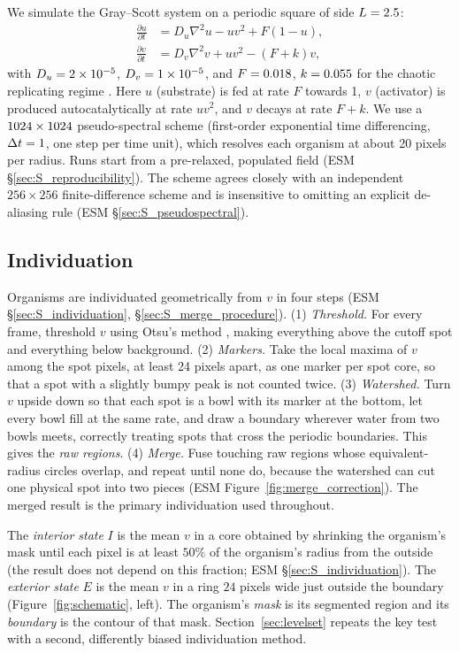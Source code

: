 \documentclass[11pt]{article}
\begin{document}
We simulate the Gray--Scott system on a periodic square of side $L=\num{2.5}$:
\begin{align}
\frac{\partial u}{\partial t} &= D_u \nabla^2 u - u v^2 + F(1-u), \label{eq:gs_u}\\
\frac{\partial v}{\partial t} &= D_v \nabla^2 v + u v^2 - (F+k) v, \label{eq:gs_v}
\end{align}
with $D_u=\num{2e-5}$, $D_v=\num{1e-5}$, and $F=\num{0.018}$, $k=\num{0.055}$ for the chaotic replicating regime \citep{Munafo}. Here $u$ (substrate) is fed at rate $F$ towards 1, $v$ (activator) is produced autocatalytically at rate $uv^2$, and $v$ decays at rate $F+k$. We use a $1024\times1024$ pseudo-spectral scheme (first-order exponential time differencing, $\Delta t=\rr{0}{\dtval}$, one step per time unit), which resolves each organism at about 20 pixels per radius. Runs start from a pre-relaxed, populated field (ESM \S\ref{sec:S_reproducibility}). The scheme agrees closely with an independent $256\times256$ finite-difference scheme \citep{Pearson1993} and is insensitive to omitting an explicit de-aliasing rule (ESM \S\ref{sec:S_pseudospectral}).

\subsection{Individuation}
\label{sec:individuation}

Organisms are individuated geometrically from $v$ in four steps (ESM \S\ref{sec:S_individuation}, \S\ref{sec:S_merge_procedure}). (1) \emph{Threshold.} For every frame, threshold $v$ using Otsu's method \citep{Otsu1979}, making everything above the cutoff spot and everything below background. (2) \emph{Markers.} Take the local maxima of $v$ among the spot pixels, at least 24 pixels apart, as one marker per spot core, so that a spot with a slightly bumpy peak is not counted twice. (3) \emph{Watershed.} Turn $v$ upside down so that each spot is a bowl with its marker at the bottom, let every bowl fill at the same rate, and draw a boundary wherever water from two bowls meets, correctly treating spots that cross the periodic boundaries. This gives the \emph{raw regions}. (4) \emph{Merge.} Fuse touching raw regions whose equivalent-radius circles overlap, and repeat until none do, because the watershed can cut one physical spot into two pieces (ESM Figure~\ref{fig:merge_correction}). The merged result is the primary individuation used throughout.

The \emph{interior state} $I$ is the mean $v$ in a core obtained by shrinking the organism's mask until each pixel is at least $50\%$ of the organism's radius from the outside (the result does not depend on this fraction; ESM \S\ref{sec:S_individuation}). The \emph{exterior state} $E$ is the mean $v$ in a ring $24$ pixels wide just outside the boundary (Figure~\ref{fig:schematic}, left). The organism's \emph{mask} is its segmented region and its \emph{boundary} is the contour of that mask. Section~\ref{sec:levelset} repeats the key test with a second, differently biased individuation method.
\end{document}
